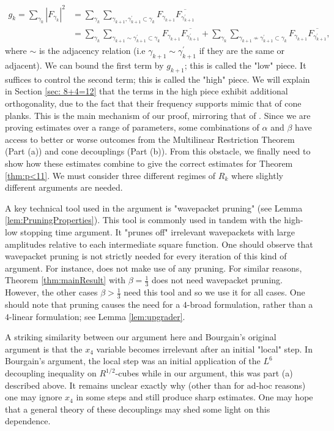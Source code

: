 \documentclass[12pt]{amsart}
\providecommand{\ol}{\overline}
\begin{document}
\begin{enumerate}
    \begin{align*}
g_k=\sum_{\gamma_k}|F_{\gamma_k}|^2&= \sum_{\gamma_k}\sum_{\gamma_{k+1}, \gamma_{k+1}^\prime\subset \gamma_k}F_{\gamma_{k+1}}\ol{F_{\gamma_{k+1}^\prime}}\\
        &= \sum_{\gamma_k}\sum_{\gamma_{k+1}\sim \gamma_{k+1}^\prime\subset \gamma_k}F_{\gamma_{k+1}}\ol{F_{\gamma_{k+1}^\prime}}+\sum_{\gamma_k}\sum_{\gamma_{k+1}\not\sim \gamma_{k+1}^\prime\subset \gamma_k}F_{\gamma_{k+1}}\ol{F_{\gamma_{k+1}^\prime}},
    \end{align*} where $\sim$ is the adjacency relation (i.e $\gamma_{k+1}\sim \gamma_{k+1}^\prime$ if they are the same or adjacent). We can bound the first term by $g_{k+1}$; this is called the "low" piece. It suffices to control the second term; this is called the "high" piece. We will explain in Section \ref{sec: 8+4=12} that the terms in the high piece exhibit additional orthogonality, due to the fact that their frequency supports mimic that of cone planks. This is the main mechanism of our proof, mirroring that of \cite{Guth_2024}. Since we are proving estimates over a range of parameters, some combinations of $\alpha$ and $\beta$ have access to better or worse outcomes from the Multilinear Restriction Theorem (Part (a)) and cone decouplings (Part (b)). From this obstacle, we finally need to show how these estimates combine to give the correct estimates for Theorem \ref{thm:p<11}. We must consider three different regimes of $R_k$ where slightly different arguments are needed.
\end{enumerate}
%
A key technical tool used in the argument is "wavepacket pruning" (see Lemma \ref{lem:PruningProperties}). This tool is commonly used in tandem with the high-low stopping time argument. It "prunes off" irrelevant wavepackets with large amplitudes relative to each intermediate square function. One should observe that wavepacket pruning is not strictly needed for every iteration of this kind of argument. For instance, \cite{maldague2024smallcapdecouplingmoment} does not make use of any pruning. For similar reasons, Theorem \ref{thm:mainResult} with $\beta = \frac{1}{3}$ does not need wavepacket pruning. However, the other cases $\beta>\frac{1}{3}$ need this tool and so we use it for all cases. One should note that pruning causes the need for a $4$-broad formulation, rather than a $4$-linear formulation; see Lemma \ref{lem:upgrader}.

A striking similarity between our argument here and Bourgain's original argument is that the $x_4$ variable becomes irrelevant after an initial "local" step. In Bourgain's argument, the local step was an initial application of the $L^6$ decoupling inequality on $R^{1/2}$-cubes while in our argument, this was part (a) described above. It remains unclear exactly why (other than for ad-hoc reasons) one may ignore $x_4$ in some steps and still produce sharp estimates. One may hope that a general theory of these decouplings may shed some light on this dependence. 
\end{document}

